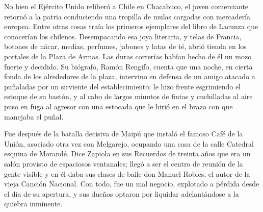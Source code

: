 \documentclass[10pt,twoside,openright]{memoir}
\begin{document}
No bien el Ejército Unido reliberó a Chile en Chacabuco, el joven
comerciante retornó a la patria conduciendo una tropilla de mulas
cargadas con mercadería europea. Entre otras cosas traía los primeros
ejemplares del libro de Lacunza que conocerían los chilenos.
Desempacando esa joya literaria, y telas de Francia, botones de nácar,
medias, perfumes, jabones y latas de té, abrió tienda en los portales de
la Plaza de Armas. Las duras correrías habían hecho de él un mozo fuerte
y decidido. Su biógrafo, Ramón Rengifo, cuenta que una noche, en cierta
fonda de los alrededores de la plaza, intervino en defensa de un amigo
atacado a puñaladas por un sirviente del establecimiento; le hizo frente
esgrimiendo el estoque de su bastón, y al cabo de largos minutos de
fintas y cuchilladas al aire puso en fuga al agresor con una estocada
que le hirió en el brazo con que manejaba el puñal.

Fue después de la batalla decisiva de Maipú que instaló el famoso Café
de la Unión, asociado otra vez con Melgarejo, ocupando una casa de la
calle Catedral esquina de Morandé. Dice Zapiola en sus Recuerdos de
treinta años que era un salón provisto de espaciosos ventanales; llegó a
ser el centro de reunión de la gente visible y en él daba sus clases de
baile don Manuel Robles, el autor de la vieja Canción Nacional. Con
todo, fue un mal negocio, explotado a pérdida desde el día de su
apertura, y sus dueños optaron por liquidar adelantándose a la quiebra
inminente.
\end{document}
